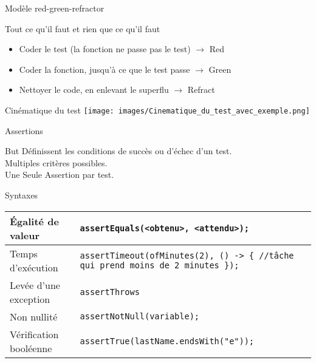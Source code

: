 \documentclass[a4paper]{beamer}
\begin{document}
{\begin{frame}{Modèle red-green-refractor}
	\begin{block}{Tout ce qu'il faut et rien que ce qu'il faut}
		\begin{itemize}
			\item Coder le test (la fonction ne passe pas le test) $\rightarrow$ Red
			\item Coder la fonction, jusqu'à ce que le test passe $\rightarrow$ Green
			\item Nettoyer le code, en enlevant le superflu $\rightarrow$ Refract
		\end{itemize}
	\end{block}
\end{frame}


\begin{frame}{Cinématique du test}
	\texttt{[image: images/Cinematique\_du\_test\_avec\_exemple.png]}
\end{frame}




\begin{frame}[fragile]{Assertions}
\begin{block}{But}
	Définissent les conditions de succès ou d'échec d'un test.\\
	Multiples critères possibles.\\
	Une Seule Assertion par test.\\
\end{block}
	\begin{block}{Syntaxes}
	\small
		\begin{tabular}{|p{}|p{}|}
			\hline
			Égalité de valeur & \small \texttt{assertEquals(<obtenu>, <attendu>);} \\
			\hline
			Temps d'exécution & \small \texttt{assertTimeout(ofMinutes(2), () -> \{  //tâche qui prend moins de 2 minutes \});} \\
			\hline
			Levée d'une exception & \small \texttt{assertThrows}\\
			\hline
			Non nullité & \small \texttt{assertNotNull(variable);}\\
			\hline
			Vérification booléenne & \small \texttt{assertTrue(lastName.endsWith("e"));}\\
			\hline
		\end{tabular}
	\end{block}
\end{frame}





}
\end{document}
